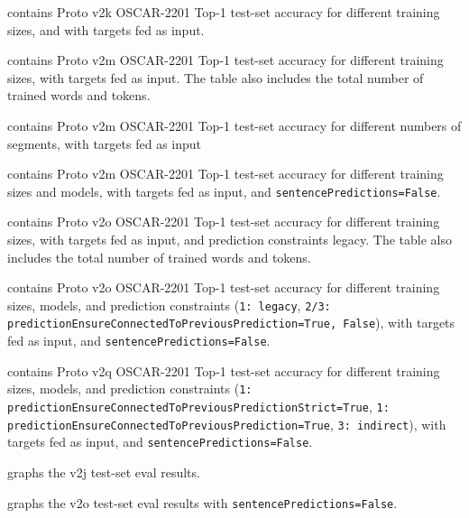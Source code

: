  contains Proto v2k OSCAR-2201 Top-1 test-set accuracy for different training sizes, and with targets fed as input.

 contains Proto v2m OSCAR-2201 Top-1 test-set accuracy for different training sizes, with targets fed as input. The table also includes the total number of trained words and tokens.

 contains Proto v2m OSCAR-2201 Top-1 test-set accuracy for different numbers of segments, with targets fed as input

 contains Proto v2m OSCAR-2201 Top-1 test-set accuracy for different training sizes and models, with targets fed as input, and \texttt{sentencePredictions=False}.

 contains Proto v2o OSCAR-2201 Top-1 test-set accuracy for different training sizes, with targets fed as input, and prediction constraints legacy. The table also includes the total number of trained words and tokens.

 contains Proto v2o OSCAR-2201 Top-1 test-set accuracy for different training sizes, models, and prediction constraints (\texttt{1: legacy}, \texttt{2/3: predictionEnsureConnectedToPreviousPrediction=True, False}), with targets fed as input, and \texttt{sentencePredictions=False}.

 contains Proto v2q OSCAR-2201 Top-1 test-set accuracy for different training sizes, models, and prediction constraints (\texttt{1: predictionEnsureConnectedToPreviousPredictionStrict=True}, \texttt{1: predictionEnsureConnectedToPreviousPrediction=True}, \texttt{3: indirect}), with targets fed as input, and \texttt{sentencePredictions=False}.

 graphs the v2j test-set eval results.

 graphs the v2o test-set eval results with \texttt{sentencePredictions=False}.

